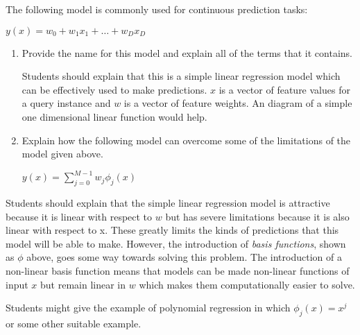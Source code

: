 \documentclass[--SOLUTION-OPTION--]{ditpaper}
\begin{document}
\clearpage


\question 
	\begin{enumerate}
\question The following model is commonly used for continuous prediction tasks:

\begin{center}
$y(x)=w_0 + w_1x_1 + \dots + w_Dx_D$
\end{center}

\begin{enumerate}
\item Provide the name for this model and explain all of the terms that it contains.

		\begin{answer}
		Students should explain that this is a simple linear regression model which can be effectively used to make predictions. $x$ is a vector of feature values for a query instance and $w$ is a vector of feature weights. An diagram of a simple one dimensional linear function would help.
		\end{answer}
				
\item Explain how the following model can overcome some of the limitations of the model given above. 

\begin{center}
$\displaystyle y(x)=\sum_{j=0}^{M - 1}w_j{\phi}_j(x)$
\end{center}
\end{enumerate} 

		\begin{answer}
		Students should explain that the simple linear regression model is attractive because it is linear with respect to $w$ but has severe limitations because it is also linear with respect to x. These greatly limits the kinds of predictions that this model will be able to make. However, the introduction of \emph{basis functions}, shown as $\phi$ above, goes some way towards solving this problem. The introduction of a non-linear basis function means that models can be made non-linear functions of input $x$ but remain linear in $w$ which makes them computationally easier to solve.
		
		Students might give the example of polynomial regression in which ${\phi}_j(x)=x^j$ or some other suitable example.
		\end{answer}
		



\end{enumerate}
\end{document}
